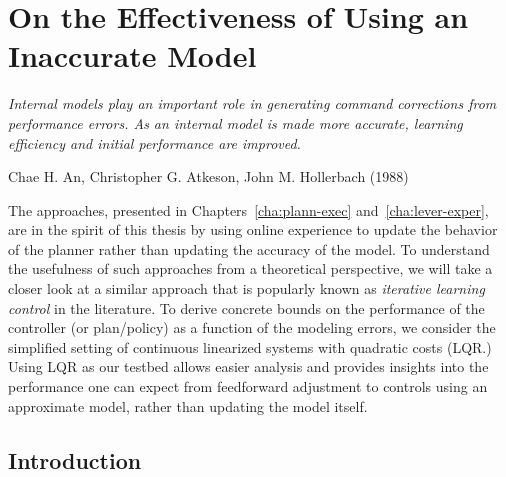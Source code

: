 \chapter{On the Effectiveness of Using an Inaccurate Model}
\label{cha:ilc}

\epigraph{\textit{Internal models play an important role in generating
    command corrections from performance errors. As an internal model
    is made more accurate, learning efficiency and initial performance
    are improved.}}{Chae H. An, Christopher G. Atkeson, John
  M. Hollerbach (1988)}

The approaches, presented in Chapters~\ref{cha:plann-exec}
and~\ref{cha:lever-exper}, are 
in the spirit of this thesis by using online experience to update the
behavior of the planner rather than updating the accuracy of the
model. To understand the usefulness of such approaches from a
theoretical perspective, we will take a closer look at a similar
approach that is popularly known as \textit{iterative learning
  control} in the literature. To derive concrete bounds on the
performance of the controller (or plan/policy) as a function of the
modeling errors, we consider the simplified setting of continuous
linearized systems with quadratic costs (LQR.) Using LQR as our
testbed allows easier analysis and provides insights into the
performance one can expect from feedforward adjustment to controls
using an approximate model, rather than updating the model itself.

\section{Introduction}
\label{sec:intro}

